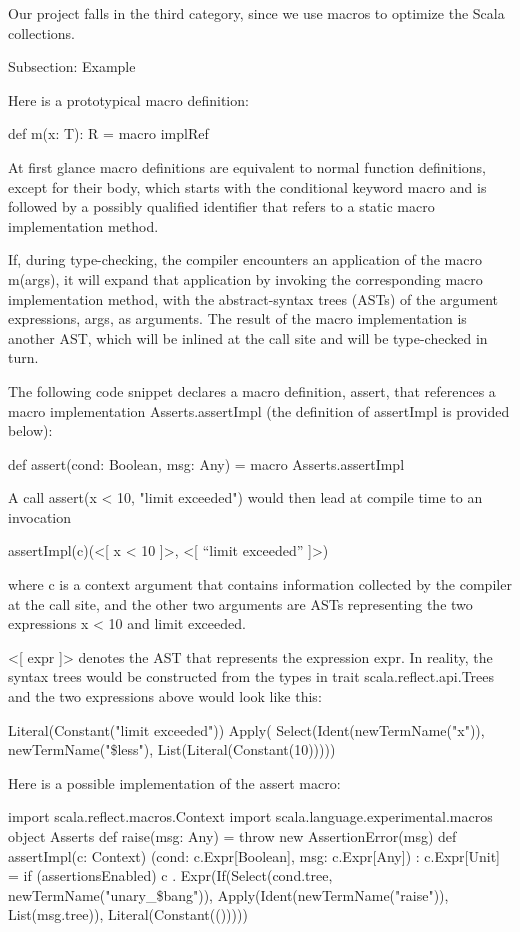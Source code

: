 Our project falls in the third category, since we use macros to optimize
the Scala collections.


Subsection: Example

Here is a prototypical macro definition:

def m(x: T): R = macro implRef

At first glance macro definitions are equivalent to normal function definitions,
except for their body, which starts with the conditional keyword macro and is
followed by a possibly qualified identifier that refers to a static macro
implementation method.

If, during type-checking, the compiler encounters an application of the macro
m(args), it will expand that application by invoking the corresponding macro
implementation method, with the abstract-syntax trees (ASTs) of the argument
expressions, args, as arguments. The result of the macro implementation is
another AST, which will be inlined at the call site and will be type-checked in
turn.

The following code snippet declares a macro definition, assert, that references
a macro implementation Asserts.assertImpl (the definition of assertImpl is
provided below):

def assert(cond: Boolean, msg: Any) = macro Asserts.assertImpl

A call assert(x < 10, "limit exceeded") would then lead at compile time to an
invocation

assertImpl(c)(<[ x < 10 ]>, <[ “limit exceeded” ]>)

where c is a context argument that contains information collected by the
compiler at the call site, and the other two arguments are ASTs representing the
two expressions x < 10 and limit exceeded.

<[ expr ]> denotes the AST that represents the expression expr. In reality, the
syntax trees would be constructed from the types in trait
scala.reflect.api.Trees and the two expressions above would look like this:

Literal(Constant("limit exceeded"))
Apply(
  Select(Ident(newTermName("x")), newTermName("\$less"),
  List(Literal(Constant(10)))))
  
Here is a possible implementation of the assert macro:

import scala.reflect.macros.Context
import scala.language.experimental.macros
object Asserts {
  def raise(msg: Any) = throw new AssertionError(msg)
  def assertImpl(c: Context)
    (cond: c.Expr[Boolean], msg: c.Expr[Any]) : c.Expr[Unit] =
   if (assertionsEnabled)
      c . Expr(If(Select(cond.tree, newTermName("unary_\$bang")),
Apply(Ident(newTermName("raise")), List(msg.tree)), Literal(Constant(()))))
}

